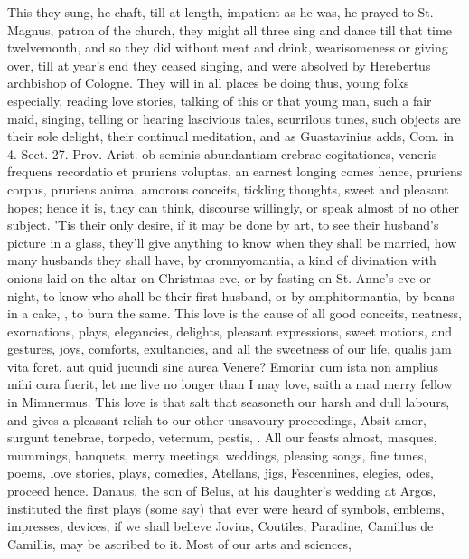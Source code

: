 {This they sung, he chaft, till at length, impatient as he was, he
prayed to St. Magnus, patron of the church, they might all three sing
and dance till that time twelvemonth, and so they did without
meat and drink, wearisomeness or giving over, till at year's end they
ceased singing, and were absolved by Herebertus archbishop of Cologne.
They will in all places be doing thus, young folks especially, reading
love stories, talking of this or that young man, such a fair maid,
singing, telling or hearing lascivious tales, scurrilous tunes, such
objects are their sole delight, their continual meditation, and as
Guastavinius adds, Com. in 4. Sect. 27. Prov. Arist. ob seminis
abundantiam crebrae cogitationes, veneris frequens recordatio et
pruriens voluptas, \etc{} an earnest longing comes hence, pruriens corpus,
pruriens anima, amorous conceits, tickling thoughts, sweet and pleasant
hopes; hence it is, they can think, discourse willingly, or speak
almost of no other subject. 'Tis their only desire, if it may be done
by art, to see their husband's picture in a glass, they'll give
anything to know when they shall be married, how many husbands they
shall have, by cromnyomantia, a kind of divination with onions
laid on the altar on Christmas eve, or by fasting on St. Anne's eve or
night, to know who shall be their first husband, or by amphitormantia,
by beans in a cake, \etc{}, to burn the same. This love is the cause of
all good conceits,  neatness, exornations, plays, elegancies,
delights, pleasant expressions, sweet motions, and gestures, joys,
comforts, exultancies, and all the sweetness of our life, qualis
jam vita foret, aut quid jucundi sine aurea Venere? Emoriar cum
ista non amplius mihi cura fuerit, let me live no longer than I may
love, saith a mad merry fellow in Mimnermus. This love is that salt
that seasoneth our harsh and dull labours, and gives a pleasant relish
to our other unsavoury proceedings, Absit amor, surgunt tenebrae,
torpedo, veternum, pestis, \etc{}. All our feasts almost, masques,
mummings, banquets, merry meetings, weddings, pleasing songs, fine
tunes, poems, love stories, plays, comedies, Atellans, jigs,
Fescennines, elegies, odes, \etc{} proceed hence. Danaus, the son of
Belus, at his daughter's wedding at Argos, instituted the first plays
(some say) that ever were heard of symbols, emblems, impresses,
devices, if we shall believe Jovius, Coutiles, Paradine, Camillus de
Camillis, may be ascribed to it. Most of our arts and sciences,
}
